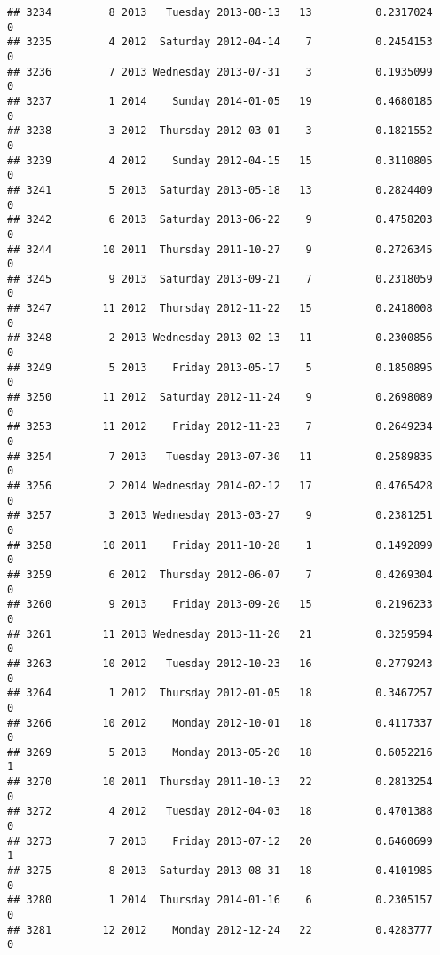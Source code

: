 \documentclass[
]{article}
\begin{document}
\begin{verbatim}
## 3234         8 2013   Tuesday 2013-08-13   13          0.2317024             0
## 3235         4 2012  Saturday 2012-04-14    7          0.2454153             0
## 3236         7 2013 Wednesday 2013-07-31    3          0.1935099             0
## 3237         1 2014    Sunday 2014-01-05   19          0.4680185             0
## 3238         3 2012  Thursday 2012-03-01    3          0.1821552             0
## 3239         4 2012    Sunday 2012-04-15   15          0.3110805             0
## 3241         5 2013  Saturday 2013-05-18   13          0.2824409             0
## 3242         6 2013  Saturday 2013-06-22    9          0.4758203             0
## 3244        10 2011  Thursday 2011-10-27    9          0.2726345             0
## 3245         9 2013  Saturday 2013-09-21    7          0.2318059             0
## 3247        11 2012  Thursday 2012-11-22   15          0.2418008             0
## 3248         2 2013 Wednesday 2013-02-13   11          0.2300856             0
## 3249         5 2013    Friday 2013-05-17    5          0.1850895             0
## 3250        11 2012  Saturday 2012-11-24    9          0.2698089             0
## 3253        11 2012    Friday 2012-11-23    7          0.2649234             0
## 3254         7 2013   Tuesday 2013-07-30   11          0.2589835             0
## 3256         2 2014 Wednesday 2014-02-12   17          0.4765428             0
## 3257         3 2013 Wednesday 2013-03-27    9          0.2381251             0
## 3258        10 2011    Friday 2011-10-28    1          0.1492899             0
## 3259         6 2012  Thursday 2012-06-07    7          0.4269304             0
## 3260         9 2013    Friday 2013-09-20   15          0.2196233             0
## 3261        11 2013 Wednesday 2013-11-20   21          0.3259594             0
## 3263        10 2012   Tuesday 2012-10-23   16          0.2779243             0
## 3264         1 2012  Thursday 2012-01-05   18          0.3467257             0
## 3266        10 2012    Monday 2012-10-01   18          0.4117337             0
## 3269         5 2013    Monday 2013-05-20   18          0.6052216             1
## 3270        10 2011  Thursday 2011-10-13   22          0.2813254             0
## 3272         4 2012   Tuesday 2012-04-03   18          0.4701388             0
## 3273         7 2013    Friday 2013-07-12   20          0.6460699             1
## 3275         8 2013  Saturday 2013-08-31   18          0.4101985             0
## 3280         1 2014  Thursday 2014-01-16    6          0.2305157             0
## 3281        12 2012    Monday 2012-12-24   22          0.4283777             0

\end{verbatim}
\end{document}
